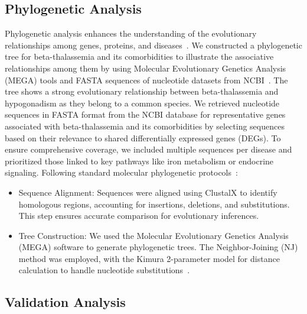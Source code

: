 \vspace*{-\parskip}
\subsection{Phylogenetic Analysis}
\label{sec:phylogenetic}

Phylogenetic analysis enhances the understanding of the evolutionary relationships among genes, proteins, and diseases~\cite{phy_ref1}. We constructed a phylogenetic tree for beta-thalassemia and its comorbidities to illustrate the associative relationships among them by using Molecular Evolutionary Genetics Analysis (MEGA) tools and FASTA sequences of nucleotide datasets from NCBI~\cite{phy_ref1}. The tree shows a strong evolutionary relationship between beta-thalassemia and hypogonadism as they belong to a common species.
We retrieved nucleotide sequences in FASTA format from the NCBI database for representative genes associated with beta-thalassemia and its comorbidities by selecting sequences based on their relevance to shared differentially expressed genes (DEGs). To ensure comprehensive coverage, we included multiple sequences per disease and prioritized those linked to key pathways like iron metabolism or endocrine signaling.
Following standard molecular phylogenetic protocols~\cite{phy_ref2}:
\begin{itemize}
    \item Sequence Alignment: Sequences were aligned using ClustalX to identify homologous regions, accounting for insertions, deletions, and substitutions. This step ensures accurate comparison for evolutionary inferences.
    \item Tree Construction: We used the Molecular Evolutionary Genetics Analysis (MEGA) software to generate phylogenetic trees. The Neighbor-Joining (NJ) method was employed, with the Kimura 2-parameter model for distance calculation to handle nucleotide substitutions~\cite{phy_ref3}.
\end{itemize}

\vspace*{-\parskip}
\subsection{Validation Analysis}
\label{sec:validation}

